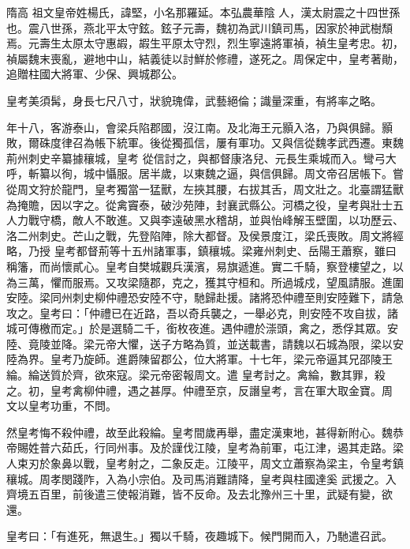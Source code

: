 
\begin{pinyinscope}

 隋高
 祖文皇帝姓楊氏，諱堅，小名那羅延。本弘農華陰
 人，漢太尉震之十四世孫也。震八世孫，燕北平太守鉉。鉉子元壽，魏初為武川鎮司馬，因家於神武樹頹焉。元壽生太原太守惠嘏，嘏生平原太守烈，烈生寧遠將軍禎，禎生皇考忠。初，禎屬魏末喪亂，避地中山，結義徒以討鮮於修禮，遂死之。周保定中，皇考著勛，追贈柱國大將軍、少保、興城郡公。



 皇考美須髯，身長七尺八寸，狀貌瑰偉，武藝絕倫；識量深重，有將率之略。



 年十八，客游泰山，會梁兵陷郡國，沒江南。及北海王元顥入洛，乃與俱歸。顥敗，爾硃度律召為帳下統軍。後從獨孤信，屢有軍功。又與信從魏孝武西遷。東魏荊州刺史辛纂據穰城，皇考
 從信討之，與都督康洛兒、元長生乘城而入。彎弓大呼，斬纂以徇，城中懾服。居半歲，以東魏之逼，與信俱歸。周文帝召居帳下。嘗從周文狩於龍門，皇考獨當一猛獸，左挾其腰，右拔其舌，周文壯之。北臺謂猛獸為掩贍，因以字之。從禽竇泰，破沙苑陣，封襄武縣公。河橋之役，皇考與壯士五人力戰守橋，敵人不敢進。又與李遠破黑水稽胡，並與怡峰解玉壁圍，以功歷云、洛二州刺史。芒山之戰，先登陷陣，除大都督。及侯景度江，梁氏喪敗。周文將經略，乃授
 皇考都督荊等十五州諸軍事，鎮穰城。梁雍州刺史、岳陽王蕭察，雖曰稱籓，而尚懷貳心。皇考自樊城觀兵漢濱，易旗遞進。實二千騎，察登樓望之，以為三萬，懼而服焉。又攻梁隨郡，克之，獲其守桓和。所過城戍，望風請服。進圍安陸。梁同州刺史柳仲禮恐安陸不守，馳歸赴援。諸將恐仲禮至則安陸難下，請急攻之。皇考曰：「仲禮已在近路，吾以奇兵襲之，一舉必克，則安陸不攻自拔，諸城可傳檄而定。」於是選騎二千，銜枚夜進。遇仲禮於漴頭，禽之，悉俘其眾。安陸、竟陵並降。梁元帝大懼，送子方略為質，並送載書，請魏以石城為限，梁以安陸為界。皇考乃旋師。進爵陳留郡公，位大將軍。十七年，梁元帝逼其兄邵陵王綸。綸送質於齊，欲來寇。梁元帝密報周文。遣
 皇考討之。禽綸，數其罪，殺之。初，皇考禽柳仲禮，遇之甚厚。仲禮至京，反譖皇考，言在軍大取金寶。周
 文以皇考功重，不問。



 然皇考悔不殺仲禮，故至此殺綸。皇考間歲再舉，盡定漢東地，甚得新附心。魏恭帝賜姓普六茹氏，行同州事。及於謹伐江陵，皇考為前軍，屯江津，遏其走路。梁人束刃於象鼻以戰，皇考射之，二象反走。江陵平，周文立蕭察為梁主，令皇考鎮穰城。周孝閔踐阼，入為小宗伯。及司馬消難請降，皇考與柱國達奚
 武援之。入齊境五百里，前後遣三使報消難，皆不反命。及去北豫州三十里，武疑有變，欲還。



 皇考曰：「有進死，無退生。」獨以千騎，夜趣城下。候門開而入，乃馳遣召武。




\end{pinyinscope}
